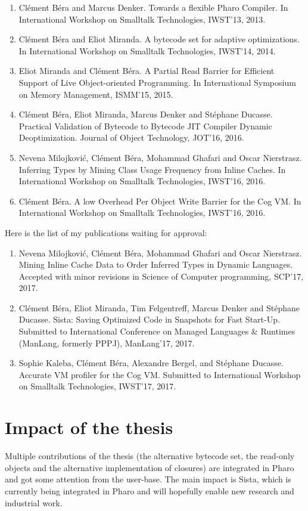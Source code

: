 \documentclass[a4paper,12pt,twoside]{../includes/ThesisStyle}
\begin{document}
\begin{enumerate}
	\item Cl\'ement B\'era and Marcus Denker. Towards a flexible Pharo Compiler. In International Workshop on Smalltalk Technologies, IWST'13, 2013.
	\item Cl\'ement B\'era and Eliot Miranda. A bytecode set for adaptive optimizations. In International Workshop on Smalltalk Technologies, IWST'14, 2014.
	\item Eliot Miranda and Cl\'ement B\'era. A Partial Read Barrier for Efficient Support of Live Object-oriented Programming. In International Symposium on Memory Management, ISMM'15, 2015.
	\item Cl\'ement B\'era, Eliot Miranda, Marcus Denker and St\'ephane Ducasse. Practical Validation of Bytecode to Bytecode JIT Compiler Dynamic Deoptimization. Journal of Object Technology, JOT'16, 2016.
	\item Nevena Milojkovi\'c, Cl\'ement B\'era, Mohammad Ghafari and Oscar Nierstrasz. Inferring Types by Mining Class Usage Frequency from Inline Caches. In International Workshop on Smalltalk Technologies, IWST'16, 2016.
	\item Cl\'ement B\'era. A low Overhead Per Object Write Barrier for the Cog VM. In International Workshop on Smalltalk Technologies, IWST'16, 2016.
\end{enumerate}

Here is the list of my publications waiting for approval:

\begin{enumerate}
	\item Nevena Milojkovi\'c, Cl\'ement B\'era, Mohammad Ghafari and Oscar Nierstrasz. Mining Inline Cache Data to Order Inferred Types in Dynamic Languages. Accepted with minor revisions in Science of Computer programming, SCP'17, 2017.
	\item Cl\'ement B\'era, Eliot Miranda, Tim Felgentreff, Marcus Denker and St\'ephane Ducasse. Sista: Saving Optimized Code in Snapshots for Fast Start-Up. Submitted to International Conference on Managed Languages \& Runtimes (ManLang, formerly PPPJ), ManLang'17, 2017.
	\item Sophie Kaleba, Cl\'ement B\'era, Alexandre Bergel, and St\'ephane Ducasse. Accurate VM profiler for the Cog VM. Submitted to International Workshop on Smalltalk Technologies, IWST'17, 2017.
\end{enumerate}

\section{Impact of the thesis}

Multiple contributions of the thesis (the alternative bytecode set, the read-only objects and the alternative implementation of closures) are integrated in Pharo and got some attention from the user-base. The main impact is Sista, which is currently being integrated in Pharo and will hopefully enable new research and industrial work.

\ifx\wholebook\relax\else
    
\end{document}
